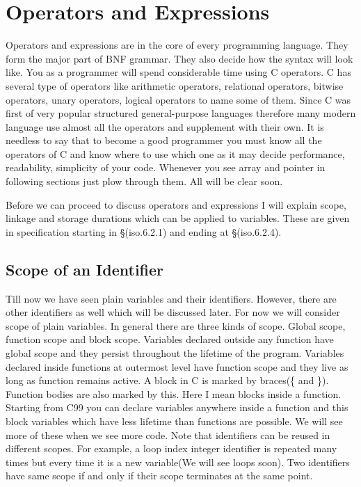 \chapter{Operators and Expressions}
Operators and expressions are in the core of every programming language. They
form the major part of BNF grammar. They also decide how the syntax will look
like. You as a programmer will spend considerable time using C operators. C has
several type of operators like arithmetic operators, relational operators,
bitwise operators, unary operators, logical operators to name some of them.
Since C was first of very popular structured general-purpose languages therefore
many modern language use almost all the operators and supplement with their own.
It is needless to say that to become a good programmer you must know all the
operators of C and know where to use which one as it may decide performance,
readability, simplicity of your code. Whenever you see array and pointer in
following sections just plow through them. All will be clear soon.

Before we can proceed to discuss operators and expressions I will explain
scope, linkage and storage durations which can be applied to
variables. These are given in specification starting in \S(iso.6.2.1) and ending at
\S(iso.6.2.4).

\section{Scope of an Identifier}
Till now we have seen plain variables and their identifiers. However, there are
other identifiers as well which will be discussed later. For now we will
consider scope of plain variables. In general there are three kinds of
scope. Global scope, function scope and block scope. Variables declared outside
any function have global scope and they persist throughout the lifetime of the
program. Variables declared inside functions at outermost level have function
scope and they live as long as function remains active. A block in C is marked
by braces(\{ and \}). Function bodies are also marked by this. Here I mean
blocks inside a function. Starting from C99 you can declare variables anywhere
inside a function and this block variables which have less lifetime than
functions are possible. We will see more of these when we see more code. Note
that identifiers can be reused in different scopes. For example, a loop index
integer identifier is repeated many times but every time it is a new
variable(We will see loops soon). Two identifiers have same scope if and only
if their scope terminates at the same point.

